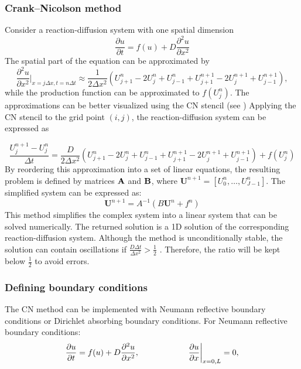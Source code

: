 \documentclass[10pt,letterpaper]{article}
\newcommand{\pdvn}[3]{\frac{\partial^{#1} {#2}}{\partial {#3}^{#1}}}
\begin{document}
\subsubsection*{Crank–Nicolson method}\label{cranknicolson}
Consider a reaction-diffusion system with one spatial dimension
\begin{equation}
    \frac{\partial u}{\partial t} =  f(u) + D\pdvn{2}{u}{x}
\end{equation}
The spatial part of the equation can be approximated by
\begin{equation}
    \pdvn{2}{u}{x} \biggr\rvert_{x=j\Delta x,t=n\Delta t} \approx \frac{1}{2\Delta x^{2}}\left( U^{n}_{j+1} -  2U^{n}_{j} + U^{n}_{j-1} + U^{n+1}_{j+1} - 2U^{n+1}_{j} + U^{n+1}_{j-1}\right),
\end{equation}
while the production function can be approximated to $f ( U^{n}_{j})$. The approximations can be better visualized using the CN stencil (see )
Applying the CN stencil to the grid point $(i, j)$, the reaction-diffusion system can be expressed as

\begin{equation}
    \frac{U^{n+1}_{j} - U^{n}_{j}}{\Delta t} = \frac{D}{2\Delta x^{2}}\left( U^{n}_{j+1} -  2U^{n}_{j} + U^{n}_{j-1} + U^{n+1}_{j+1} - 2U^{n+1}_{j} + U^{n+1}_{j-1}\right) +  f( U^{n}_{j})
    \label{CN_stencil}
\end{equation}
By reordering this approximation into a set of linear equations, the resulting problem is defined by matrices $\bf A$ and $\bf B$, where $\textbf{U}^{n+1} = [U^{n}_{0}, \ldots , U^{n}_{J-1}]$. The simplified system can be expressed as:
\begin{equation}
    \textbf{U}^{n+1} = A^{-1}(B\textbf{U}^{n} + f^{n})
\end{equation}
This method simplifies the complex system into a linear system that can be solved numerically. The returned solution is a 1D solution of the corresponding reaction-diffusion system. Although the method is unconditionally stable, the solution can contain oscillations if $ \frac{D\Delta t}{\Delta x^{2}} >\frac{1}{2} $ \cite{trefethen1996finite}. Therefore, the ratio will be kept below $\frac{1}{2}$ to avoid errors.

\subsubsection*{Defining boundary conditions}\label{methods_boundary_conditions_CN}
The CN method can be implemented with Neumann reflective boundary conditions or Dirichlet absorbing boundary conditions.
For Neumann reflective boundary conditions:
\begin{equation}
    \frac{\partial u}{\partial t} =  f(u) + D\pdvn{2}{u}{x},   \quad \quad \quad \quad \quad \quad \pdv{u}{x}\biggr\rvert_{x=0,L}=0,
\end{equation}
\end{document}
